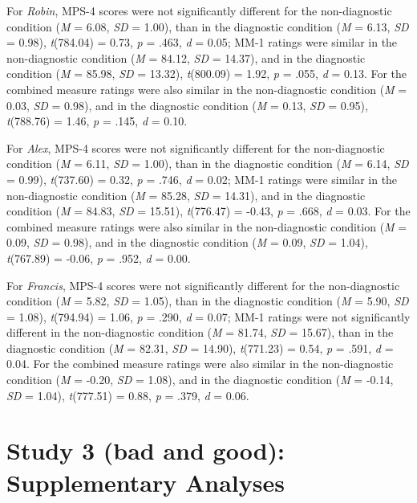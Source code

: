 \documentclass[
  man,floatsintext]{apa6}
\begin{document}
For \emph{Robin}, MPS-4 scores were not significantly different for the non-diagnostic condition (\emph{M} = 6.08, \emph{SD} = 1.00), than in the diagnostic condition (\emph{M} = 6.13, \emph{SD} = 0.98), \emph{t}(784.04) = 0.73, \emph{p} = .463, \emph{d} = 0.05; MM-1 ratings were similar in the non-diagnostic condition (\emph{M} = 84.12, \emph{SD} = 14.37), and in the diagnostic condition (\emph{M} = 85.98, \emph{SD} = 13.32), \emph{t}(800.09) = 1.92, \emph{p} = .055, \emph{d} = 0.13. For the combined measure ratings were also similar in the non-diagnostic condition (\emph{M} = 0.03, \emph{SD} = 0.98), and in the diagnostic condition (\emph{M} = 0.13, \emph{SD} = 0.95), \emph{t}(788.76) = 1.46, \emph{p} = .145, \emph{d} = 0.10.

For \emph{Alex}, MPS-4 scores were not significantly different for the non-diagnostic condition (\emph{M} = 6.11, \emph{SD} = 1.00), than in the diagnostic condition (\emph{M} = 6.14, \emph{SD} = 0.99), \emph{t}(737.60) = 0.32, \emph{p} = .746, \emph{d} = 0.02; MM-1 ratings were similar in the non-diagnostic condition (\emph{M} = 85.28, \emph{SD} = 14.31), and in the diagnostic condition (\emph{M} = 84.83, \emph{SD} = 15.51), \emph{t}(776.47) = -0.43, \emph{p} = .668, \emph{d} = 0.03. For the combined measure ratings were also similar in the non-diagnostic condition (\emph{M} = 0.09, \emph{SD} = 0.98), and in the diagnostic condition (\emph{M} = 0.09, \emph{SD} = 1.04), \emph{t}(767.89) = -0.06, \emph{p} = .952, \emph{d} = 0.00.

For \emph{Francis}, MPS-4 scores were not significantly different for the non-diagnostic condition (\emph{M} = 5.82, \emph{SD} = 1.05), than in the diagnostic condition (\emph{M} = 5.90, \emph{SD} = 1.08), \emph{t}(794.94) = 1.06, \emph{p} = .290, \emph{d} = 0.07; MM-1 ratings were not significantly different in the non-diagnostic condition (\emph{M} = 81.74, \emph{SD} = 15.67), than in the diagnostic condition (\emph{M} = 82.31, \emph{SD} = 14.90), \emph{t}(771.23) = 0.54, \emph{p} = .591, \emph{d} = 0.04. For the combined measure ratings were also similar in the non-diagnostic condition (\emph{M} = -0.20, \emph{SD} = 1.08), and in the diagnostic condition (\emph{M} = -0.14, \emph{SD} = 1.04), \emph{t}(777.51) = 0.88, \emph{p} = .379, \emph{d} = 0.06.

\pagebreak

\section{Study 3 (bad and good): Supplementary Analyses}\label{study-3-bad-and-good-supplementary-analyses}
\end{document}
